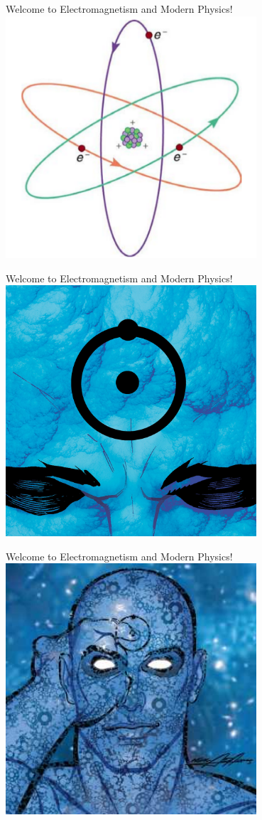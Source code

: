 \documentclass{beamer}
\begin{document}
\begin{frame}{Welcome to Electromagnetism and Modern Physics!}
\centering
\includegraphics[width=0.7\textwidth]{figures/orbital.png}
\end{frame}

\begin{frame}{Welcome to Electromagnetism and Modern Physics!}
\centering
\includegraphics[width=0.7\textwidth]{figures/manhattan.jpg}
\end{frame}

\begin{frame}{Welcome to Electromagnetism and Modern Physics!}
\centering
\includegraphics[width=0.7\textwidth]{figures/manhattan2.jpg}
\end{frame}
\end{document}
